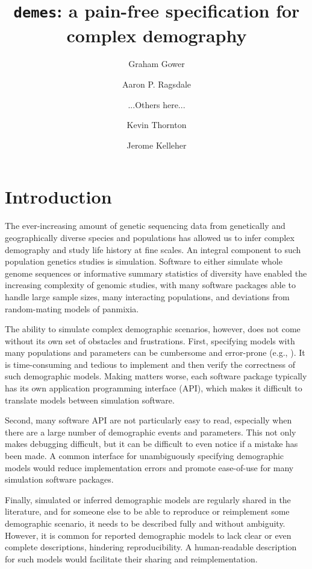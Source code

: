 \documentclass[11pt]{article}
\newcommand{\demes}[0]{\texttt{demes}}
\begin{document}
\title{\demes: a pain-free specification for complex demography}
\author[*]{Graham Gower}
\author[*]{Aaron P. Ragsdale}
\author[ ]{...Others here...}
\author[**]{Kevin Thornton}
\author[**]{Jerome Kelleher}
\maketitle

\abstract{
}

\section*{Introduction}

The ever-increasing amount of genetic sequencing data from genetically and
geographically diverse species and populations has allowed us to infer complex
demography and study life history at fine scales. An integral component to such
population genetics studies is simulation. Software to either simulate whole
genome sequences
\citep{thornton2014c++,kelleher2016efficient,haller2019slim,adrion2020community}
or informative summary statistics of diversity
\citep{gutenkunst2009inferring,kamm2017efficient,jouganous2017inferring} have
enabled the increasing complexity of genomic studies, with many software
packages able to handle large sample sizes, many interacting populations, and
deviations from random-mating models of panmixia.

The ability to simulate complex demographic scenarios, however, does not come
without its own set of obstacles and frustrations. First, specifying models
with many populations and parameters can be cumbersome and error-prone (e.g.,
\citep{ragsdale2020lessons}). It is time-consuming and tedious to implement and
then verify the correctness of such demographic models. Making matters worse,
each software package typically has its own application programming interface
(API), which makes it difficult to translate models between simulation
software.

Second, many software API are not particularly easy to read, especially when
there are a large number of demographic events and parameters. This not only
makes debugging difficult, but it can be difficult to even notice if a mistake
has been made. A common interface for unambiguously specifying demographic
models would reduce implementation errors and promote ease-of-use for many
simulation software packages.

Finally, simulated or inferred demographic models are regularly shared in the
literature, and for someone else to be able to reproduce or reimplement some
demographic scenario, it needs to be described fully and without ambiguity.
However, it is common for reported demographic models to lack clear or even
complete descriptions, hindering reproducibility. A human-readable description
for such models would facilitate their sharing and reimplementation.
\end{document}
